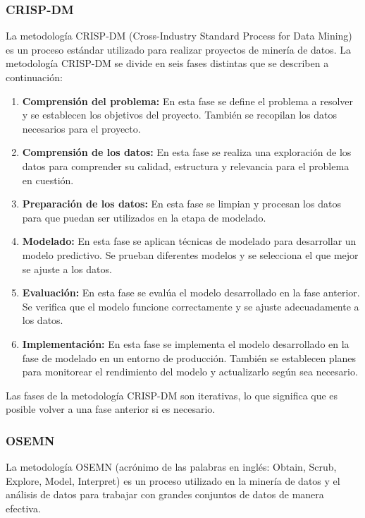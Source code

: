 \subsubsection{CRISP-DM}
La metodología CRISP-DM (Cross-Industry Standard Process for Data Mining) es un proceso estándar utilizado para realizar proyectos de minería de datos. La metodología CRISP-DM se divide en seis fases distintas que se describen a continuación:

\begin{enumerate}
    \item \textbf{Comprensión del problema:} En esta fase se define el problema a resolver y se establecen los objetivos del proyecto. También se recopilan los datos necesarios para el proyecto.
    \item \textbf{Comprensión de los datos:} En esta fase se realiza una exploración de los datos para comprender su calidad, estructura y relevancia para el problema en cuestión.
    \item \textbf{Preparación de los datos:} En esta fase se limpian y procesan los datos para que puedan ser utilizados en la etapa de modelado.
    \item \textbf{Modelado:} En esta fase se aplican técnicas de modelado para desarrollar un modelo predictivo. Se prueban diferentes modelos y se selecciona el que mejor se ajuste a los datos.
    \item \textbf{Evaluación:} En esta fase se evalúa el modelo desarrollado en la fase anterior. Se verifica que el modelo funcione correctamente y se ajuste adecuadamente a los datos.
    \item \textbf{Implementación:} En esta fase se implementa el modelo desarrollado en la fase de modelado en un entorno de producción. También se establecen planes para monitorear el rendimiento del modelo y actualizarlo según sea necesario.
\end{enumerate}

Las fases de la metodología CRISP-DM son iterativas, lo que significa que es posible volver a una fase anterior si es necesario.

\subsubsection{OSEMN}

La metodología OSEMN (acrónimo de las palabras en inglés: Obtain, Scrub, Explore, Model, Interpret) es un proceso utilizado en la minería de datos y el análisis de datos para trabajar con grandes conjuntos de datos de manera efectiva. 

